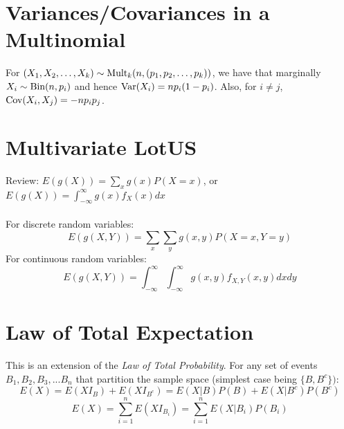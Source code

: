 \documentclass[11pt]{article}
\begin{document}
\section*{Variances/Covariances in a Multinomial}
For $(X_1, X_2, \dots, X_k) \sim \textrm{Mult}_k(n, (p_1, p_2, \dots, p_k))$, we have that marginally $X_i \sim \textrm{Bin}(n, p_i)$ and hence $\textrm{Var}(X_i) = np_i(1-p_i)$. Also, for $i\neq j$, $\textrm{Cov}(X_i, X_j) = -np_ip_j$.

\section*{Multivariate LotUS}
Review: $E(g(X)) = \sum_xg(x)P(X=x)$, or $E(g(X)) = \int_{-\infty}^{\infty}g(x)f_X(x)dx$\\ \\
For discrete random variables:
\[E(g(X, Y)) = \sum_x\sum_yg(x, y)P(X=x, Y=y)\]
For continuous random variables:
\[E(g(X, Y)) = \int_{-\infty}^{\infty}\int_{-\infty}^{\infty}g(x, y)f_{X,Y}(x, y)dxdy\]


\section*{Law of Total Expectation}
This is an extension of the \emph{Law of Total Probability}. For any set of events $B_1, B_2, B_3, ... B_n$ that partition the sample space (simplest case being $\{B, B^c\})$:
  \[E(X) = E(XI_{B}) + E(XI_{B^c}) = E(X | B)P(B) + E(X | B^c)P(B^c)\] \[E(X) = \sum_{i=1}^{n} E(XI_{B_i}) = \sum_{i=1}^{n}E(X | B_i)P(B_i)\]
\end{document}
